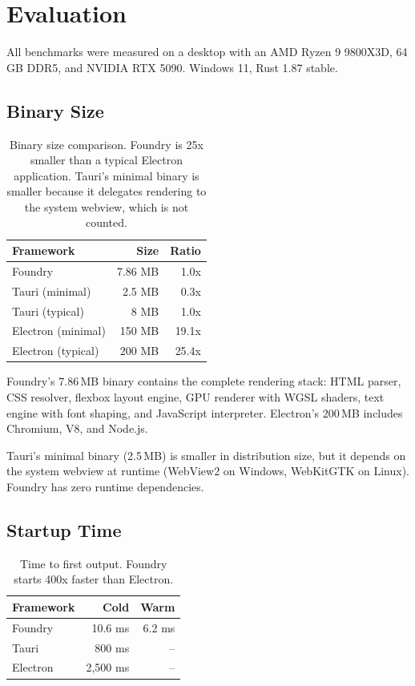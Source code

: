 \documentclass[11pt,twocolumn]{article}
\begin{document}
\section{Evaluation}

All benchmarks were measured on a desktop with an AMD Ryzen 9 9800X3D, 64\,GB DDR5, and NVIDIA RTX 5090. Windows 11, Rust 1.87 stable.

\subsection{Binary Size}

\begin{table}[h]
\centering
\begin{tabular}{lrr}
\toprule
\textbf{Framework} & \textbf{Size} & \textbf{Ratio} \\
\midrule
Foundry & 7.86 MB & 1.0x \\
Tauri (minimal) & 2.5 MB & 0.3x \\
Tauri (typical) & 8 MB & 1.0x \\
Electron (minimal) & 150 MB & 19.1x \\
Electron (typical) & 200 MB & 25.4x \\
\bottomrule
\end{tabular}
\caption{Binary size comparison. Foundry is 25x smaller than a typical Electron application. Tauri's minimal binary is smaller because it delegates rendering to the system webview, which is not counted.}
\label{tab:size}
\end{table}

Foundry's 7.86\,MB binary contains the complete rendering stack: HTML parser, CSS resolver, flexbox layout engine, GPU renderer with WGSL shaders, text engine with font shaping, and JavaScript interpreter. Electron's 200\,MB includes Chromium, V8, and Node.js.

Tauri's minimal binary (2.5\,MB) is smaller in distribution size, but it depends on the system webview at runtime (WebView2 on Windows, WebKitGTK on Linux). Foundry has zero runtime dependencies.

\subsection{Startup Time}

\begin{table}[h]
\centering
\begin{tabular}{lrr}
\toprule
\textbf{Framework} & \textbf{Cold} & \textbf{Warm} \\
\midrule
Foundry & 10.6 ms & 6.2 ms \\
Tauri & 800 ms & -- \\
Electron & 2,500 ms & -- \\
\bottomrule
\end{tabular}
\caption{Time to first output. Foundry starts 400x faster than Electron.}
\label{tab:startup}
\end{table}
\end{document}
